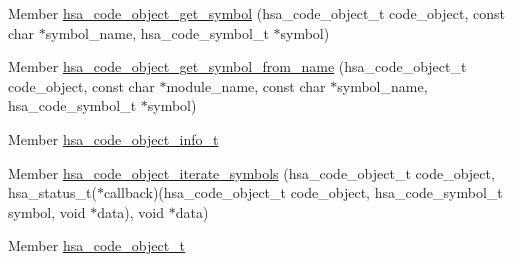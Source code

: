 \begin{DoxyRefList}
\item[Member \mbox{\hyperlink{group__code-object_ga0a52c838e8e43bb0f9760624af109a91}{hsa\+\_\+code\+\_\+object\+\_\+get\+\_\+symbol}} (hsa\+\_\+code\+\_\+object\+\_\+t code\+\_\+object, const char $\ast$symbol\+\_\+name, hsa\+\_\+code\+\_\+symbol\+\_\+t $\ast$symbol)]\label{deprecated__deprecated000054}%
%
 
\item[Member \mbox{\hyperlink{group__code-object_ga10a8f3d500757a85f04e691732a32ec4}{hsa\+\_\+code\+\_\+object\+\_\+get\+\_\+symbol\+\_\+from\+\_\+name}} (hsa\+\_\+code\+\_\+object\+\_\+t code\+\_\+object, const char $\ast$module\+\_\+name, const char $\ast$symbol\+\_\+name, hsa\+\_\+code\+\_\+symbol\+\_\+t $\ast$symbol)]\label{deprecated__deprecated000055}%
%
 
\item[Member \mbox{\hyperlink{group__code-object_ga2025ec20684a99297a1912de92b50575}{hsa\+\_\+code\+\_\+object\+\_\+info\+\_\+t}} ]\label{deprecated__deprecated000050}%
%
 
\item[Member \mbox{\hyperlink{group__code-object_ga169ded05e38ae66cab5324e2d27489c4}{hsa\+\_\+code\+\_\+object\+\_\+iterate\+\_\+symbols}} (hsa\+\_\+code\+\_\+object\+\_\+t code\+\_\+object, hsa\+\_\+status\+\_\+t($\ast$callback)(hsa\+\_\+code\+\_\+object\+\_\+t code\+\_\+object, hsa\+\_\+code\+\_\+symbol\+\_\+t symbol, void $\ast$data), void $\ast$data)]\label{deprecated__deprecated000058}%
%
 
\item[Member \mbox{\hyperlink{group__code-object_ga7819c76c55ddc508293d3c4158d85236}{hsa\+\_\+code\+\_\+object\+\_\+serialize}} (hsa\+\_\+code\+\_\+object\+\_\+t code\+\_\+object, hsa\+\_\+status\+\_\+t($\ast$alloc\+\_\+callback)(size\+\_\+t size, hsa\+\_\+callback\+\_\+data\+\_\+t data, void $\ast$$\ast$address), hsa\+\_\+callback\+\_\+data\+\_\+t callback\+\_\+data, const char $\ast$options, void $\ast$$\ast$serialized\+\_\+code\+\_\+object, size\+\_\+t $\ast$serialized\+\_\+code\+\_\+object\+\_\+size)]\label{deprecated__deprecated000046}%
%
 
\item[Member \mbox{\hyperlink{group__code-object_gafae7c731c8bfc39b3050ef08ae8bb3e3}{hsa\+\_\+code\+\_\+object\+\_\+t}} ]\label{deprecated__deprecated000044}%
%
 

\end{DoxyRefList}
